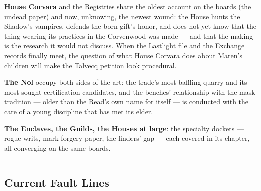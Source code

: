 \textbf{House Corvara} and the Registries share the oldest account on the boards (the undead paper) and now, unknowing, the newest wound: the House hunts the Shadow's vampires, defends the born gift's honor, and does not yet know that the thing wearing its practices in the Corvenwood was made --- and that the making is the research it would not discuss. When the Lastlight file and the Exchange records finally meet, the question of what House Corvara does about Maren's children will make the Talvecq petition look procedural.

\textbf{The Nol} occupy both sides of the art: the trade's most baffling quarry and its most sought certification candidates, and the benches' relationship with the mask tradition --- older than the Read's own name for itself --- is conducted with the care of a young discipline that has met its elder.

\textbf{The Enclaves, the Guilds, the Houses at large}: the specialty dockets --- rogue writs, mark-forgery paper, the finders' gap --- each covered in its chapter, all converging on the same boards.

\medskip\hrule\medskip

\subsection{Current Fault Lines}

